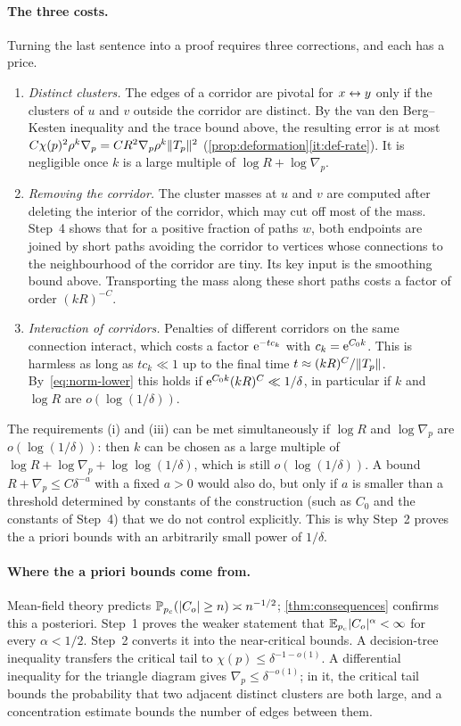 \paragraph{The three costs.}
Turning the last sentence into a proof requires three corrections, and each has a price.
\begin{enumerate}[label=(\roman*)]
  \item \emph{Distinct clusters.} The edges of a corridor are pivotal for $x\leftrightarrow y$ only if the
  clusters of $u$ and $v$ outside the corridor are distinct. By the van den Berg--Kesten inequality
  and the trace bound above, the resulting error is at most
  $C\chi(p)^2\rho^k\nabla_p=CR^2\nabla_p\rho^k\lVert T_p\rVert^2$
  (\cref{prop:deformation}\ref{it:def-rate}). It is negligible once $k$ is a large multiple of
  $\log R+\log\nabla_p$.
  \item \emph{Removing the corridor.} The cluster masses at $u$ and $v$ are computed after deleting the
  interior of the corridor, which may cut off most of the mass. Step~4 shows that for a positive
  fraction of paths $w$, both endpoints are joined by short paths avoiding the corridor to vertices
  whose connections to the neighbourhood of the corridor are tiny. Its key input is the smoothing bound
  above. Transporting the mass along these short paths costs a factor of order $(kR)^{-C}$.
  \item \emph{Interaction of corridors.} Penalties of different corridors on the same connection
  interact, which costs a factor $\mathrm{e}^{-tc_k}$ with $c_k=\mathrm{e}^{C_0k}$. This is harmless as long as
  $tc_k\ll1$ up to the final time $t\approx(kR)^C/\lVert T_p\rVert$. By~\eqref{eq:norm-lower} this holds if
  $\mathrm{e}^{C_0k}(kR)^C\ll1/\delta$, in particular if $k$ and $\log R$ are $o(\log(1/\delta))$.
\end{enumerate}
The requirements (i) and (iii) can be met simultaneously if $\log R$ and $\log\nabla_p$ are
$o(\log(1/\delta))$: then $k$ can be chosen as a large multiple of
$\log R+\log\nabla_p+\log\log(1/\delta)$, which is still $o(\log(1/\delta))$. A bound
$R+\nabla_p\le C\delta^{-a}$ with a fixed $a>0$ would also do, but only if $a$ is smaller than a
threshold determined by constants of the construction (such as $C_0$ and the constants of Step~4) that
we do not control explicitly. This is why Step~2 proves the a priori bounds with an arbitrarily small
power of $1/\delta$.

\paragraph{Where the a priori bounds come from.}
Mean-field theory predicts $\mathbb P_{p_c}(\lvert C_o\rvert\ge n)\asymp n^{-1/2}$; \cref{thm:consequences} confirms
this a posteriori. Step~1 proves the weaker statement that $\mathbb E_{p_c}\lvert C_o\rvert^\alpha<\infty$ for every
$\alpha<1/2$. Step~2 converts it into the near-critical bounds. A decision-tree inequality transfers
the critical tail to $\chi(p)\le\delta^{-1-o(1)}$. A differential inequality for the triangle diagram
gives $\nabla_p\le\delta^{-o(1)}$; in it, the critical tail bounds the probability that two adjacent
distinct clusters are both large, and a concentration estimate bounds the number of edges between
them.

